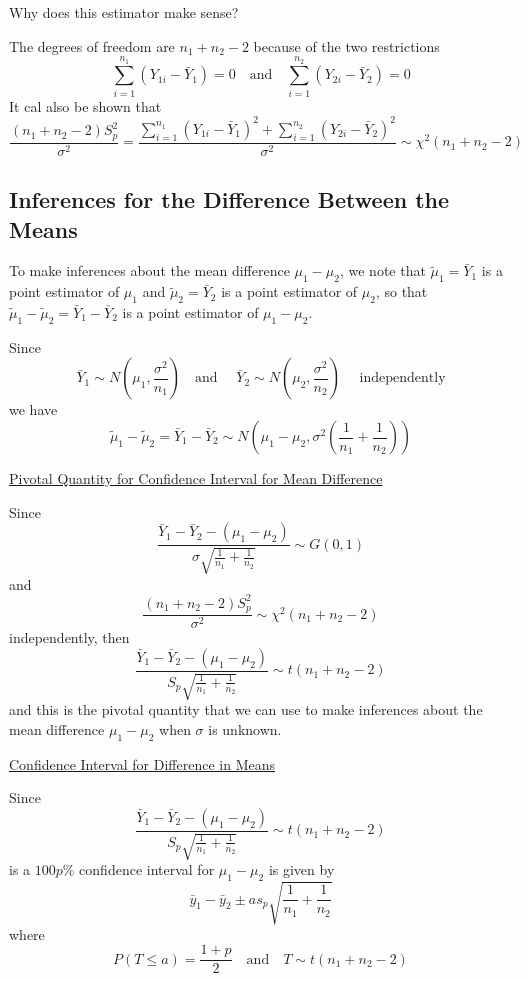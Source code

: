 Why does this estimator make sense?

The degrees of freedom are $ n_1+n_2-2 $ because of the two restrictions
\[\sum_{i=1}^{n_{1}}\left(Y_{1 i}-\bar{Y}_{1}\right)=0 \quad \text{and} \quad \sum_{i=1}^{n_{2}}\left(Y_{2 i}-\bar{Y}_{2}\right)=0\]
It cal also be shown that
\[\frac{\left(n_{1}+n_{2}-2\right) S_{p}^{2}}{\sigma^{2}}=\frac{\sum_{i=1}^{n_{1}}\left(Y_{1 i}-\bar{Y}_{1}\right)^{2}+\sum_{i=1}^{n_{2}}
    \left(Y_{2 i}-\bar{Y}_{2}\right)^{2}}{\sigma^{2}} \sim \chi^{2}\left(n_{1}+n_{2}-2\right)\]


\subsection{Inferences for the Difference Between the Means}
To make inferences about the mean difference $ \mu_1-\mu_2 $,
we note that $ \tilde{\mu}_1=\bar{Y}_1 $ is a point estimator of $ \mu_1 $ and
$ \tilde{\mu}_2=\bar{Y}_2 $ is a point estimator of $ \mu_2 $, so that $ \tilde{\mu}_1-
    \tilde{\mu}_2=\bar{Y}_1-\bar{Y}_2 $ is a point estimator of $ \mu_1-\mu_2 $.

Since
\[\bar{Y}_{1} \sim N\left(\mu_{1}, \frac{\sigma^{2}}{n_{1}}\right) \quad \text{and } \quad \bar{Y}_{2} \sim N\left(\mu_{2}, \frac{\sigma^{2}}{n_{2}}\right) \quad \text{ independently}\]
we have
\[\tilde{\mu}_{1}-\tilde{\mu}_{2}=\bar{Y}_{1}-\bar{Y}_{2}
    \sim N\left(\mu_{1}-\mu_{2}, \sigma^{2}\left(\frac{1}{n_{1}}+\frac{1}{n_{2}}\right)\right)\]

\underline{Pivotal Quantity for Confidence Interval for Mean Difference}

Since
\[\frac{\bar{Y}_{1}-\bar{Y}_{2}-\left(\mu_{1}-\mu_{2}\right)}{\sigma \sqrt{\frac{1}{n_{1}}+\frac{1}{n_{2}}}} \sim G(0,1)\]
and
\[\frac{\left(n_{1}+n_{2}-2\right) S_{p}^{2}}{\sigma^{2}} \sim \chi^{2}\left(n_{1}+n_{2}-2\right)\]
independently, then
\[\frac{\bar{Y}_{1}-\bar{Y}_{2}-\left(\mu_{1}-\mu_{2}\right)}{S_{p} \sqrt{\frac{1}{n_{1}}+\frac{1}{n_{2}}}} \sim t\left(n_{1}+n_{2}-2\right)\]
and this is the pivotal quantity that we can use to make inferences about the mean difference
$ \mu_1-\mu_2 $ when $ \sigma $ is unknown.

\underline{Confidence Interval for Difference in Means}

Since
\[\frac{\bar{Y}_{1}-\bar{Y}_{2}-\left(\mu_{1}-\mu_{2}\right)}{S_{p} \sqrt{\frac{1}{n_{1}}+\frac{1}{n_{2}}}} \sim t\left(n_{1}+n_{2}-2\right)\]
is a $ 100p\% $ confidence interval for $ \mu_1-\mu_2 $ is given by
\[\bar{y}_{1}-\bar{y}_{2} \pm a s_{p} \sqrt{\frac{1}{n_{1}}+\frac{1}{n_{2}}}\]
where
\[P(T \leq a)=\frac{1+p}{2} \quad \text{and} \quad T \sim t\left(n_{1}+n_{2}-2\right)\]

